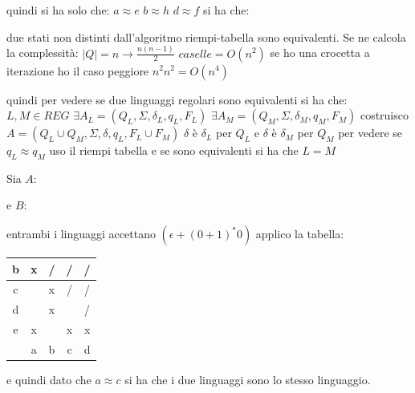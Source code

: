 quindi si ha solo che:
$a\approx e\,\,b\approx h\,\,d\approx f$
si ha che:
\begin{theorem}
	due stati non distinti dall'algoritmo riempi-tabella sono equivalenti. Se ne calcola la complessità:
	$|Q|=n\to \frac{n(n-1)}{2}\,\,caselle=O(n^2)$
	se ho una crocetta a iterazione ho il caso peggiore $n^2n^2=O(n^4)$
\end{theorem}
quindi per vedere se due linguaggi regolari sono equivalenti si ha che:
$L,M\in REG$
$\exists A_L=(Q_L,\Sigma,\delta_L,q_L,F_L)$
$\exists A_M=(Q_M,\Sigma,\delta_M,q_M,F_M)$
costruisco $A=(Q_L\cup Q_M,\Sigma,\delta,q_L,F_L\cup F_M)$
$\delta$ è $\delta_L$ per $Q_L$ e $\delta$ è $\delta_M$ per $Q_M$
per vedere se $q_L\approx q_M$ uso il riempi tabella e se sono equivalenti si ha che $L=M$
\begin{example}
Sia $A$:
\begin{center}
\end{center}
e $B$:
\begin{center}
\end{center}
entrambi i linguaggi accettano $(\epsilon+(0+1)^*0)$
applico la tabella:
\begin{center}
\begin{tabular}{c|c|c|c|c|}
  \hline
  b & x & / & / & / \\
  \hline
  c &   & x & / & / \\
  \hline
  d &   & x &   & / \\
  \hline
  e & x &   & x & x \\
  \hline
	& a & b & c & d \\
  \hline
\end{tabular}
\end{center}
e quindi dato che $a\approx c$ si ha che i due linguaggi sono lo stesso linguaggio.
\end{example}
